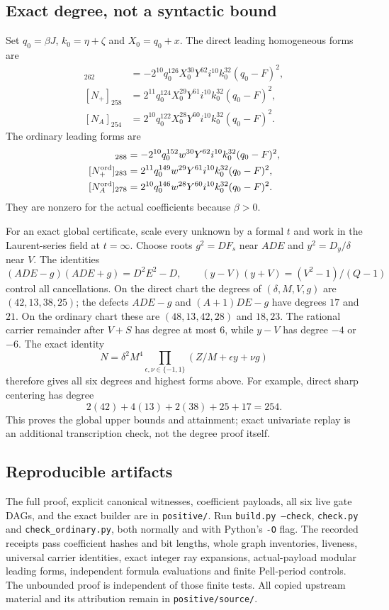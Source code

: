 \subsection{Exact degree, not a syntactic bound}
Set $q_0=\beta J$, $k_0=\eta+\zeta$ and $X_0=q_0+x$. The direct leading homogeneous forms are
\begin{align*}
[N_0]_{262}&=-2^{10}q_0^{126}X_0^{30}Y^{62}i^{10}k_0^{32}(q_0-F)^2,\\
[N_+]_{258}&=2^{11}q_0^{124}X_0^{29}Y^{61}i^{10}k_0^{32}(q_0-F)^2,\\
[N_A]_{254}&=2^{10}q_0^{122}X_0^{28}Y^{60}i^{10}k_0^{32}(q_0-F)^2.
\end{align*}
The ordinary leading forms are
\begin{align*}
[N^{\rm ord}_0]_{288}&=-2^{10}q_0^{152}w^{30}Y^{62}i^{10}k_0^{32}(q_0-F)^2,\\
[N^{\rm ord}_+]_{283}&=2^{11}q_0^{149}w^{29}Y^{61}i^{10}k_0^{32}(q_0-F)^2,\\
[N^{\rm ord}_A]_{278}&=2^{10}q_0^{146}w^{28}Y^{60}i^{10}k_0^{32}(q_0-F)^2.
\end{align*}
They are nonzero for the actual coefficients because $\beta>0$.

For an exact global certificate, scale every unknown by a formal $t$ and work in the Laurent-series field at $t=\infty$. Choose roots $g^2=DF_s$ near $ADE$ and $y^2=D_y/\delta$ near $V$. The identities
\[
 (ADE-g)(ADE+g)=D^2E^2-D,\qquad
 (y-V)(y+V)=(V^2-1)/(Q-1)
\]
control all cancellations. On the direct chart the degrees of $(\delta,M,V,g)$ are $(42,13,38,25)$; the defects $ADE-g$ and $(A+1)DE-g$ have degrees $17$ and $21$. On the ordinary chart these are $(48,13,42,28)$ and $18,23$. The rational carrier remainder after $V+S$ has degree at most $6$, while $y-V$ has degree $-4$ or $-6$. The exact identity
\[
 N=\delta^2M^4\prod_{\epsilon,\nu\in\{-1,1\}}
       (Z/M+\epsilon y+\nu g)
\]
therefore gives all six degrees and highest forms above. For example, direct sharp centering has degree
\[
 2(42)+4(13)+2(38)+25+17=254.
\]
This proves the global upper bounds and attainment; exact univariate replay is an additional transcription check, not the degree proof itself.

\subsection{Reproducible artifacts}
The full proof, explicit canonical witnesses, coefficient payloads, all six live gate DAGs, and the exact builder are in \texttt{positive/}. Run \texttt{build.py --check}, \texttt{check.py} and \texttt{check\_ordinary.py}, both normally and with Python's \texttt{-O} flag. The recorded receipts pass coefficient hashes and bit lengths, whole graph inventories, liveness, universal carrier identities, exact integer ray expansions, actual-payload modular leading forms, independent formula evaluations and finite Pell-period controls. The unbounded proof is independent of those finite tests. All copied upstream material and its attribution remain in \texttt{positive/source/}.
